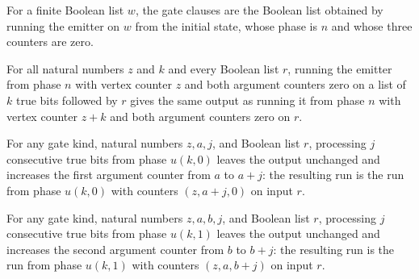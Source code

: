 \begin{definition}
\label{BoolCircuit.CktSatReduction.Emitter.gateClauses}
\leanok
{}
For a finite Boolean list $w$, the gate clauses are the Boolean list obtained by running
the emitter on $w$ from the initial state, whose phase is $n$ and whose three counters
are zero.
\end{definition}

\begin{theorem}
\label{BoolCircuit.CktSatReduction.Emitter.emRun_n}
\leanok
{}
For all natural numbers $z$ and $k$ and every Boolean list $r$, running the emitter from
phase $n$ with vertex counter $z$ and both argument counters zero on a list of $k$ true
bits followed by $r$ gives the same output as running it from phase $n$ with vertex
counter $z+k$ and both argument counters zero on $r$.
\end{theorem}

\begin{theorem}
\label{BoolCircuit.CktSatReduction.Emitter.emRun_u0}
\leanok
{}
For any gate kind, natural numbers $z,a,j$, and Boolean list $r$, processing $j$
consecutive true bits from phase $u(k,0)$ leaves the output unchanged and increases the
first argument counter from $a$ to $a+j$: the resulting run is the run from phase
$u(k,0)$ with counters $(z,a+j,0)$ on input $r$.
\end{theorem}

\begin{theorem}
\label{BoolCircuit.CktSatReduction.Emitter.emRun_u1}
\leanok
{}
For any gate kind, natural numbers $z,a,b,j$, and Boolean list $r$, processing $j$
consecutive true bits from phase $u(k,1)$ leaves the output unchanged and increases the
second argument counter from $b$ to $b+j$: the resulting run is the run from phase
$u(k,1)$ with counters $(z,a,b+j)$ on input $r$.
\end{theorem}


